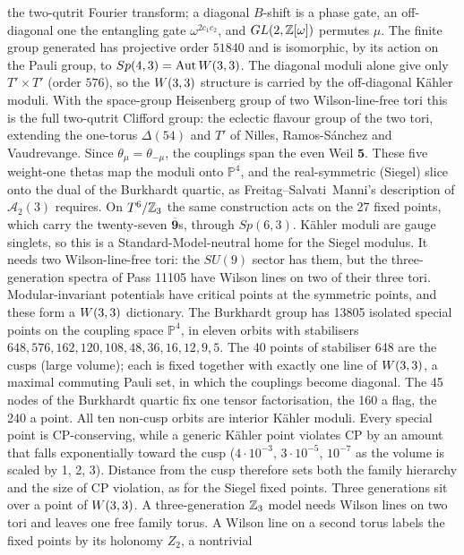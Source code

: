 the two-qutrit Fourier transform; a diagonal $B$-shift is a phase gate, an off-diagonal one the entangling gate
$\omega^{2c_1c_2}$, and $GL(2,\mathbb{Z}[\omega])$ permutes $\mu$. The finite group generated has projective order $51840$ and is
isomorphic, by its action on the Pauli group, to $Sp(4,3)=\mathrm{Aut}\,W(3,3)$. The diagonal moduli alone give only
$T'\times T'$ (order $576$), so the $W(3,3)$ structure is carried by the off-diagonal K\"ahler moduli. With the
space-group Heisenberg group of two Wilson-line-free tori this is the full two-qutrit Clifford group: the eclectic
flavour group of the two tori, extending the one-torus $\Delta(54)$ and $T'$ of Nilles, Ramos-S\'anchez and
Vaudrevange. Since $\theta_\mu=\theta_{-\mu}$, the couplings span the even Weil $\mathbf5$. These five weight-one thetas
map the moduli onto $\mathbb P^4$, and the real-symmetric (Siegel) slice onto the dual of the Burkhardt quartic, as
Freitag--Salvati~Manni's description of $\mathcal A_2(3)$ requires. On $T^6/\mathbb{Z}_3$ the same construction acts on the 27
fixed points, which carry the twenty-seven $\overline{\mathbf9}$s, through $Sp(6,3)$. K\"ahler moduli are gauge singlets,
so this is a Standard-Model-neutral home for the Siegel modulus. It needs two Wilson-line-free tori: the $SU(9)$ sector
has them, but the three-generation spectra of Pass 11105 have Wilson lines on two of their three tori.
Modular-invariant potentials have critical points at the symmetric points, and these form a $W(3,3)$ dictionary. The
Burkhardt group has 13805 isolated special points on the coupling space $\mathbb P^4$, in eleven orbits with
stabilisers $648,576,162,120,108,48,36,16,12,9,5$. The 40 points of stabiliser 648 are the cusps (large volume); each is
fixed together with exactly one line of $W(3,3)$, a maximal commuting Pauli set, in which the couplings become diagonal. The
45 nodes of the Burkhardt quartic fix one tensor factorisation, the 160 a flag, the 240 a point. All ten non-cusp
orbits are interior K\"ahler moduli. Every special point is CP-conserving, while a generic K\"ahler point violates CP by
an amount that falls exponentially toward the cusp ($4\cdot10^{-3}$, $3\cdot10^{-5}$, $10^{-7}$ as the volume is scaled
by 1, 2, 3). Distance from the cusp therefore sets both the family hierarchy and the size of CP violation, as for the
Siegel fixed points. 
Three generations sit over a point of $W(3,3)$. A three-generation $\mathbb{Z}_3$ model needs Wilson lines on two tori and leaves
one free family torus. A Wilson line on a second torus labels the fixed points by its holonomy $Z_2$, a nontrivial
